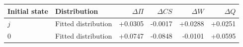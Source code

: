 \begin{tabular}{llrrrr}\toprule
Initial state & Distribution & $\Delta\Pi$ & $\Delta CS$ & $\Delta W$ & $\Delta Q$\\\midrule
$j$ & Fitted distribution & +0.0305 & -0.0017 & +0.0288 & +0.0251 \\
$0$ & Fitted distribution & +0.0747 & -0.0848 & -0.0101 & +0.0595 \\
\bottomrule\end{tabular}
